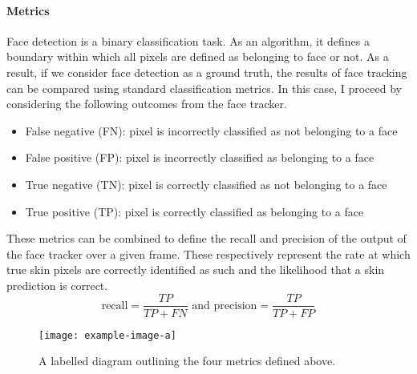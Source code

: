 \paragraph{Metrics}
Face detection is a binary classification task. As an algorithm, it defines a boundary within which all pixels are defined as belonging to face or not.
As a result, if we consider face detection as a ground truth, the results of face tracking can be compared using standard classification metrics. In this case, I proceed by considering the following outcomes from the face tracker.
\begin{itemize}
   \item False negative (FN): pixel is incorrectly classified as not belonging to a face
   \item False positive (FP): pixel is incorrectly classified as belonging to a face
   \item True negative (TN): pixel is correctly classified as not belonging to a face 
   \item True positive (TP): pixel is correctly classified as belonging to a face 
\end{itemize}
These metrics can be combined to define the recall and precision of the output of the face tracker over a given frame. These respectively represent the rate at which true skin pixels are correctly identified as such and the likelihood that a skin prediction is correct.
\begin{equation*}
    \mathrm{recall} = \frac{TP}{TP + FN} \text{ and } \mathrm{precision} = \frac{TP}{TP+FP}
\end{equation*}
\begin{figure}[H]
    \texttt{[image: example-image-a]}
   \caption{A labelled diagram outlining the four metrics defined above.} 
\end{figure}
\noindent
